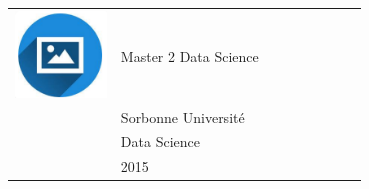 \documentclass{article}
\begin{document}
\begin{paracol}{2}
\begin{tabular}{@{}cp{0.7\linewidth}}
      \begin{minipage}{0.05\linewidth}
        \includegraphics[width=\linewidth]{picon.png}
      \end{minipage} & \vspace{-12pt}
      {\color{sidetext} Master 2 Data Science} \\[-6pt]
      & Sorbonne Université \\ 
      & Data Science \\ 
      & 2015 
\end{tabular}

\vspace{0.5cm}


\end{paracol}
\end{document}
